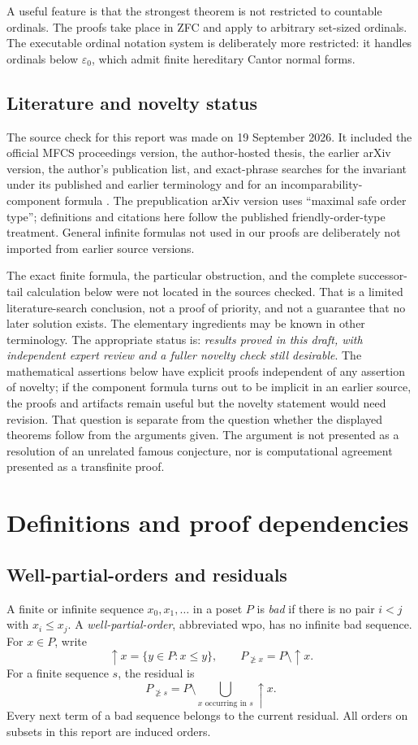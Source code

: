 \documentclass[11pt,letterpaper]{article}
\theoremstyle{definition}
\theoremstyle{remark}
\newcommand{\res}[2]{#1_{\not\ge #2}}
\begin{document}
A useful feature is that the strongest theorem is not restricted to
countable ordinals. The proofs take place in ZFC and apply to arbitrary
set-sized ordinals. The executable ordinal notation system is deliberately
more restricted: it handles ordinals below $\varepsilon_0$, which admit
finite hereditary Cantor normal forms.

\subsection{Literature and novelty status}
The source check for this report was made on 19 September 2026. It included
the official MFCS proceedings version, the author-hosted thesis, the earlier
arXiv version, the author's publication list, and exact-phrase searches for
the invariant under its published and earlier terminology and for an
incomparability-component formula
\cite{Vialard2023,VialardThesis,VialardPreprint,VialardWebsite}. The
prepublication arXiv version uses ``maximal safe order type''; definitions
and citations here follow the published friendly-order-type treatment.
General infinite formulas not used in our proofs are deliberately not
imported from earlier source versions.

The exact finite formula, the particular obstruction, and the complete
successor-tail calculation below were not located in the sources checked.
That is a limited literature-search conclusion, not a proof of priority, and
not a guarantee that no later solution exists. The elementary ingredients
may be known in other terminology. The appropriate status is:
\emph{results proved in this draft, with independent expert review and a
fuller novelty check still desirable}. The mathematical assertions below have
explicit proofs independent of any assertion of novelty; if the component
formula turns out to be implicit in an earlier source, the proofs and
artifacts remain useful but the novelty statement would need revision.
That question is separate from the question whether the displayed theorems
follow from the arguments given. The argument is not presented as a
resolution of an unrelated famous conjecture, nor is computational agreement
presented as a transfinite proof.

\section{Definitions and proof dependencies}\label{sec:preliminaries}

\subsection{Well-partial-orders and residuals}
A finite or infinite sequence $x_0,x_1,\ldots$ in a poset $P$ is
\emph{bad} if there is no pair $i<j$ with $x_i\le x_j$. A
\emph{well-partial-order}, abbreviated wpo, has no infinite bad sequence.
For $x\in P$, write
\[
 \uparrow x=\{y\in P:x\le y\},\qquad
 \res P x=P\setminus\uparrow x.
\]
For a finite sequence $s$, the residual is
\[
 \res P s=P\setminus\bigcup_{x\text{ occurring in }s}\uparrow x.
\]
Every next term of a bad sequence belongs to the current residual.
All orders on subsets in this report are induced orders.
\end{document}
